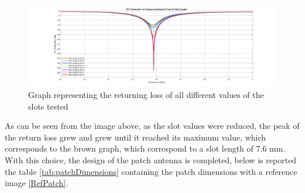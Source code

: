 \documentclass[]{article}
\begin{document}
  
  \begin{figure}[h]
  	\centering
  	\includegraphics[width=1.0\linewidth]{img/img10}
  	\caption{Graph representing the returning loss of all different values of the slots tested}
  	\label{GSsweep}
  \end{figure}
  As can be seen from the image above, as the slot values were reduced, the peak of the return loss grew and grew until it reached its maximum value, which corresponds to the brown graph, which correspond to a slot length of 7.6 mm.\\
  With this choice, the design of the patch antenna is completed, below is reported the table \eqref{tab:patchDimensions} containing the patch dimensions with a reference image \eqref{RefPatch}.\\
\end{document}
